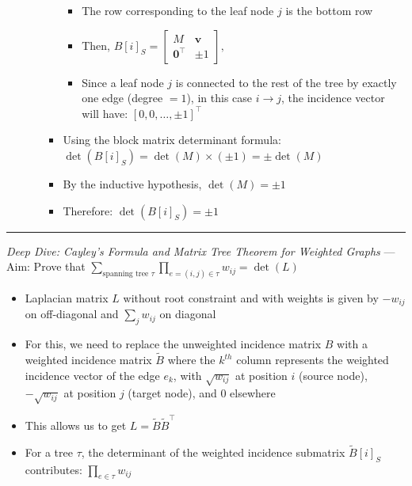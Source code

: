 \begin{itemize}
\begin{itemize}
\begin{itemize}
\begin{itemize}
                \item The row corresponding to the leaf node $ j $ is the bottom row
                \item Then, $
                B[i]_S =
                \begin{bmatrix}
                M & \mathbf{v} \\
                \mathbf{0}^\intercal & \pm 1
                \end{bmatrix},
                $
                \item Since a leaf node $ j $ is connected to the rest of the tree by exactly one edge (degree $= 1$), in this case $ i \to j $, the incidence vector will have:
                $
                [0, 0, \dots, \pm 1]^\intercal
                $
            \end{itemize}
            \item Using the block matrix determinant formula:
            $
            \det(B[i]_S) = \det(M) \times (\pm 1) = \pm \det(M)
            $
            \item By the inductive hypothesis, $ \det(M) = \pm 1 $
        \item Therefore:
        $
        \det(B[i]_S) = \pm 1
        $
        \end{itemize}
    \end{itemize}
\end{itemize}

{\color{lightgray}\hrule height 0.001mm}

\emph{Deep Dive: Cayley's Formula and Matrix Tree Theorem for Weighted Graphs} ---
Aim: Prove that $\sum_{\text{spanning tree } \tau} \prod_{e = (i, j) \in \tau} w_{ij} = \det({L})$
\begin{itemize}
    \item Laplacian matrix $L$ without root constraint and with weights is given by $-w_{ij}$ on off-diagonal and $\sum_{j} w_{ij}$ on diagonal
    \item For this, we need to replace the unweighted incidence matrix $ B $ with a weighted incidence matrix $ \tilde{B}$ where the $k^{th}$ column represents the weighted incidence vector of the edge $e_k$, with $ \sqrt{w_{ij}} $ at position $ i $ (source node), $ -\sqrt{w_{ij}} $ at position $ j $ (target node), and $ 0 $ elsewhere
    \item This allows us to get $
    L = \tilde{B} \tilde{B}^\intercal
    $
    \item For a tree $ \tau $, the determinant of the weighted incidence submatrix $ \tilde{B}[i]_S $ contributes:
    $
    \prod_{e \in \tau} w_{ij}
    $
\end{itemize}

